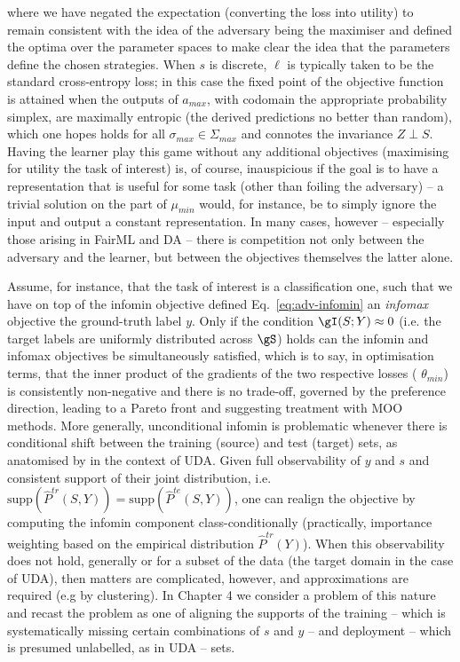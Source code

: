 %
where we have negated the expectation (converting the loss into utility) to remain consistent with
the idea of the adversary being the maximiser and defined the optima over the parameter spaces to
make clear the idea that the parameters define the chosen strategies. 
%
When \(s\) is discrete, \(\ell\) is typically taken to be the standard cross-entropy loss; in this
case the fixed point of the objective function is attained when the outputs of \(a_{max}\), with
codomain the appropriate probability simplex, are maximally entropic (the derived predictions no
better than random), which one hopes holds for all \(\sigma_{max} \in \Sigma_{max}\) and connotes
the invariance \(Z \perp S\).
%
%
Having the learner play this game without any additional objectives (maximising for utility \wrt{}
the task of interest) is, of course, inauspicious if the goal is to have a representation that is
useful for some task (other than foiling the adversary) -- a trivial solution on the part of
\(\mu_{min}\) would, for instance, be to simply ignore the input and output a constant
representation.
%
In many cases, however -- especially those arising in FairML and DA -- there is competition not
only between the adversary and the learner, but between the objectives themselves \wrt{} the latter
alone.
%

Assume, for instance, that the task of interest is a classification one, such that we have on top
of the infomin objective defined Eq.~\ref{eq:adv-infomin} an \emph{infomax} objective \wrt{} the
ground-truth label \(y\).
%
Only if the condition \(\gI(S; Y) \approx 0 \) (i.e. the target labels are uniformly distributed
across \(\gS\)) holds can the infomin and infomax objectives be simultaneously satisfied, which is
to say, in optimisation terms, that the inner product of the gradients of the two respective losses
(\wrt{} \(\theta_{min}\)) is consistently non-negative and there is no trade-off, governed by the
preference direction, leading to a Pareto front and suggesting treatment with MOO methods.
%
More generally, unconditional infomin is problematic whenever there is conditional shift between
the training (source) and test (target) sets, as anatomised by \cite{zhao2019learning} in the
context of UDA. 
%
Given full observability of \(y\) and \(s\) and consistent support of their joint distribution,
i.e. \(\text{supp}(\hat{P}^{tr}(S, Y)) = \text{supp}(\hat{P}^{te}(S, Y))\), one can realign the
objective by computing the infomin component class-conditionally (practically, importance weighting
based on the empirical distribution \(\hat{P}^{tr}(Y)\)). 
%
When this observability does not hold, generally or for a subset of the data (the target domain in
the case of UDA), then matters are complicated, however, and approximations are required (e.g by
clustering).
%
In Chapter 4 we consider a problem of this nature and recast the problem as one of aligning the
supports of the training -- which is systematically missing certain combinations of \(s\) and \(y\)
-- and deployment -- which is presumed unlabelled, as in UDA -- sets.


